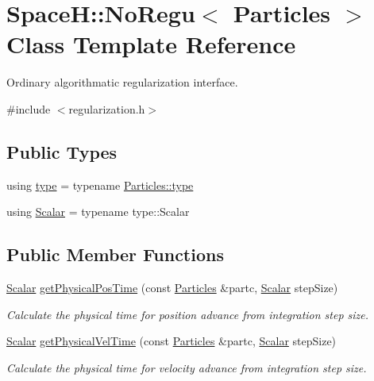 \hypertarget{class_space_h_1_1_no_regu}{}\section{SpaceH\+:\+:No\+Regu$<$ Particles $>$ Class Template Reference}
\label{class_space_h_1_1_no_regu}


Ordinary algorithmatic regularization interface.  




{\ttfamily \#include $<$regularization.\+h$>$}

\subsection*{Public Types}
\begin{DoxyCompactItemize}
\item 
using \mbox{\hyperlink{class_space_h_1_1_no_regu_a0fc6770f1b6eab98e3b28e32ab8d2454}{type}} = typename \mbox{\hyperlink{class_space_h_1_1_vel_indep_particles_a09aa167b5fb1b203ab021220601ed74c}{Particles\+::type}}
\item 
using \mbox{\hyperlink{class_space_h_1_1_no_regu_a1b9ea47811c5f906727b791ba67ff458}{Scalar}} = typename type\+::\+Scalar
\end{DoxyCompactItemize}
\subsection*{Public Member Functions}
\begin{DoxyCompactItemize}
\item 
\mbox{\hyperlink{class_space_h_1_1_no_regu_a1b9ea47811c5f906727b791ba67ff458}{Scalar}} \mbox{\hyperlink{class_space_h_1_1_no_regu_abbf14013efeed4a2be9689e57cd1a9d7}{get\+Physical\+Pos\+Time}} (const \mbox{\hyperlink{struct_space_h_1_1_particles}{Particles}} \&partc, \mbox{\hyperlink{class_space_h_1_1_no_regu_a1b9ea47811c5f906727b791ba67ff458}{Scalar}} step\+Size)
\begin{DoxyCompactList}\small\item\em Calculate the physical time for position advance from integration step size. \end{DoxyCompactList}\item 
\mbox{\hyperlink{class_space_h_1_1_no_regu_a1b9ea47811c5f906727b791ba67ff458}{Scalar}} \mbox{\hyperlink{class_space_h_1_1_no_regu_ad10e25f31d1f9519463a314f2f4155e6}{get\+Physical\+Vel\+Time}} (const \mbox{\hyperlink{struct_space_h_1_1_particles}{Particles}} \&partc, \mbox{\hyperlink{class_space_h_1_1_no_regu_a1b9ea47811c5f906727b791ba67ff458}{Scalar}} step\+Size)
\begin{DoxyCompactList}\small\item\em Calculate the physical time for velocity advance from integration step size. \end{DoxyCompactList}\end{DoxyCompactItemize}


